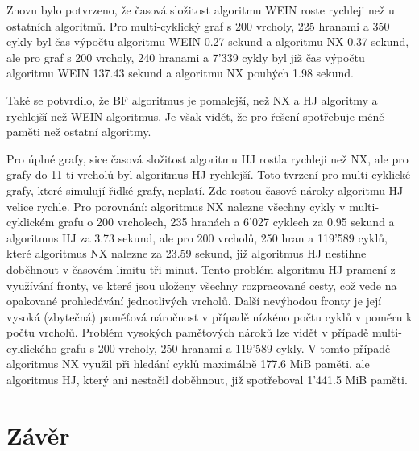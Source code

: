         Znovu bylo potvrzeno, že časová složitost algoritmu WEIN roste rychleji než u ostatních algoritmů. Pro multi-cyklický graf s 200 vrcholy, 225 hranami a 350 cykly byl čas výpočtu algoritmu WEIN 0.27 sekund a algoritmu NX 0.37 sekund, ale pro graf s 200 vrcholy, 240 hranami a 7'339 cykly byl již čas výpočtu algoritmu WEIN 137.43 sekund a algoritmu NX pouhých 1.98 sekund.

        Také se potvrdilo, že BF algoritmus je pomalejší, než NX a HJ algoritmy a rychlejší než WEIN algoritmus. Je však vidět, že pro řešení spotřebuje méně paměti než ostatní algoritmy.

        Pro úplné grafy, sice časová složitost algoritmu HJ rostla rychleji než NX, ale pro grafy do 11-ti vrcholů byl algoritmus HJ rychlejší. Toto tvrzení pro multi-cyklické grafy, které simulují řidké grafy, neplatí. Zde rostou časové nároky algoritmu HJ velice rychle. Pro porovnání: algoritmus NX nalezne všechny cykly v multi-cyklickém grafu o 200 vrcholech, 235 hranách a 6'027 cyklech za 0.95 sekund a algoritmus HJ za 3.73 sekund, ale pro 200 vrcholů, 250 hran a 119'589 cyklů, které algoritmus NX nalezne za 23.59 sekund, již algoritmus HJ nestihne doběhnout v časovém limitu tři minut. Tento problém algoritmu HJ pramení z využívání fronty, ve které jsou uloženy všechny rozpracované cesty, což vede na opakované prohledávání jednotlivých vrcholů. Další nevýhodou fronty je její vysoká (zbytečná) paměťová náročnost v případě nízkéno počtu cyklů v poměru k počtu vrcholů. Problém vysokých paměťových nároků lze vidět v případě multi-cyklického grafu s 200 vrcholy, 250 hranami a 119'589 cykly. V tomto případě algoritmus NX využil při hledání cyklů maximálně 177.6 MiB paměti, ale algoritmus HJ, který ani nestačil doběhnout, již spotřeboval 1'441.5 MiB paměti.

\chapter{Závěr}
    \label{chapter:Conclusion}
    \lipsum[2]